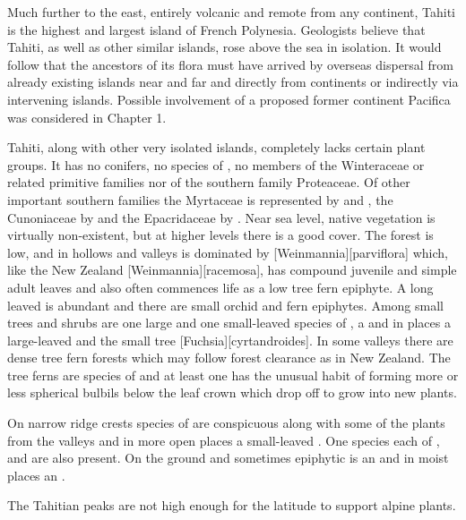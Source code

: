 Much further to the east, entirely volcanic and remote from any continent, Tahiti is the highest and largest island of French Polynesia.
Geologists believe that Tahiti, as well as other similar islands, rose above the sea in isolation.
It would follow that the ancestors of its flora must have arrived by overseas dispersal from already existing islands near and far and directly from continents or indirectly via intervening islands.
Possible involvement of a proposed former continent Pacifica was considered in Chapter 1.

Tahiti, along with other very isolated islands, completely lacks certain plant groups.
It has no conifers, no species of , no members of the Winteraceae or related primitive families nor of the southern family Proteaceae.
Of other important southern families the Myrtaceae is represented by  and , the Cunoniaceae by  and the Epacridaceae by .
Near sea level, native vegetation is virtually non-existent, but at higher levels there is a good cover.
The forest is low, and in hollows and valleys is dominated by [Weinmannia][parviflora] which, like the New Zealand [Weinmannia][racemosa], has compound juvenile and simple adult leaves and also often commences life as a low tree fern epiphyte.
A long leaved  is abundant and there are small orchid and fern epiphytes.
Among small trees and shrubs are one large and one small-leaved species of , a  and in places a large-leaved  and the small tree [Fuchsia][cyrtandroides].
In some valleys there are dense tree fern forests which may follow forest clearance as in New Zealand.
The tree ferns are species of  and at least one has the unusual habit of forming more or less spherical bulbils below the leaf crown which drop off to grow into new plants.

On narrow ridge crests species of  are conspicuous along with some of the plants from the valleys and in more open places a small-leaved .
One species each of ,  and  are also present.
On the ground and sometimes epiphytic is an  and in moist places an .

The Tahitian peaks are not high enough for the latitude to support alpine plants.

